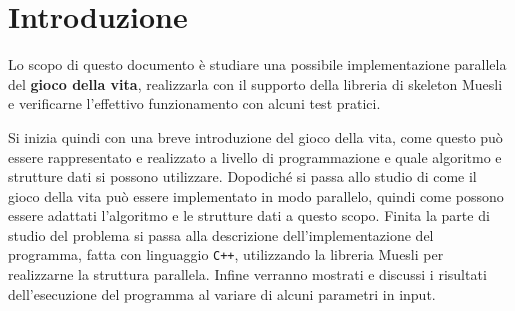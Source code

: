 \section{Introduzione}
\label{sec:introduction}
Lo scopo di questo documento \`e studiare una possibile implementazione parallela del \textbf{gioco della vita}, realizzarla con il supporto della libreria di skeleton Muesli \cite{bib:ref3} e verificarne l'effettivo funzionamento con alcuni test pratici.

Si inizia quindi con una breve introduzione del gioco della vita, come questo pu\`o essere rappresentato e realizzato a livello di programmazione e quale algoritmo e strutture dati si possono utilizzare. Dopodich\'e si passa allo studio di come il gioco della vita pu\`o essere implementato in modo parallelo, quindi come possono essere adattati l'algoritmo e le strutture dati a questo scopo. Finita la parte di studio del problema si passa alla descrizione dell'implementazione del programma, fatta con linguaggio \texttt{C++}, utilizzando la libreria Muesli per realizzarne la struttura parallela. Infine verranno mostrati e discussi i risultati dell'esecuzione del programma al variare di alcuni parametri in input.
